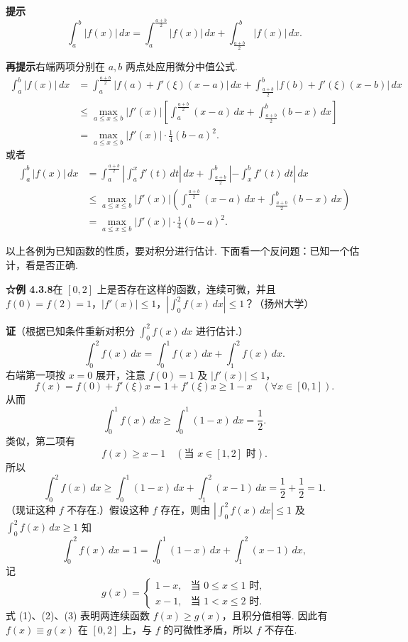 \documentclass[UTF8,12pt,a4paper,fontset=fandol]{ctexart}
\begin{document}
\noindent\textbf{提示}\quad
\[
\int_a^b|f(x)|\,dx
=\int_a^{\frac{a+b}{2}}|f(x)|\,dx
+\int_{\frac{a+b}{2}}^b|f(x)|\,dx.
\]

\noindent\textbf{再提示}\quad 右端两项分别在 $a,b$ 两点处应用微分中值公式.
\[
\begin{aligned}
\int_a^b|f(x)|\,dx
&=\int_a^{\frac{a+b}{2}}|f(a)+f'(\xi)(x-a)|\,dx
+\int_{\frac{a+b}{2}}^b|f(b)+f'(\xi)(x-b)|\,dx\\
&\le\max_{a\le x\le b}|f'(x)|
\left[\int_a^{\frac{a+b}{2}}(x-a)\,dx
+\int_{\frac{a+b}{2}}^b(b-x)\,dx\right]\\
&=\max_{a\le x\le b}|f'(x)|\cdot\frac14(b-a)^2.
\end{aligned}
\]
或者
\[
\begin{aligned}
\int_a^b|f(x)|\,dx
&=\int_a^{\frac{a+b}{2}}\left|\int_a^x f'(t)\,dt\right|\,dx
+\int_{\frac{a+b}{2}}^b\left|-\int_x^b f'(t)\,dt\right|\,dx\\
&\le\max_{a\le x\le b}|f'(x)|
\left(\int_a^{\frac{a+b}{2}}(x-a)\,dx
+\int_{\frac{a+b}{2}}^b(b-x)\,dx\right)\\
&=\max_{a\le x\le b}|f'(x)|\cdot\frac14(b-a)^2.
\end{aligned}
\]

\noindent 以上各例为已知函数的性质，要对积分进行估计. 下面看一个反问题：已知一个估计，看是否正确.

\noindent\textbf{☆例 4.3.8}\quad 在 $[0,2]$ 上是否存在这样的函数，连续可微，并且 $f(0)=f(2)=1$，$|f'(x)|\le1$，$\left|\int_0^2 f(x)\,dx\right|\le1$？（扬州大学）

\noindent\textbf{证}\quad （根据已知条件重新对积分 $\int_0^2 f(x)\,dx$ 进行估计.）
\[
\int_0^2 f(x)\,dx=\int_0^1 f(x)\,dx+\int_1^2 f(x)\,dx.
\]
右端第一项按 $x=0$ 展开，注意 $f(0)=1$ 及 $|f'(x)|\le1$，
\[
f(x)=f(0)+f'(\xi)x=1+f'(\xi)x\ge1-x\quad(\forall x\in[0,1]).
\tag{1}
\]
从而
\[
\int_0^1 f(x)\,dx\ge\int_0^1(1-x)\,dx=\frac12.
\]
类似，第二项有
\[
f(x)\ge x-1\quad(\text{当 }x\in[1,2]\text{ 时}).
\tag{2}
\]
所以
\[
\int_0^2 f(x)\,dx
\ge\int_0^1(1-x)\,dx+\int_1^2(x-1)\,dx
=\frac12+\frac12=1.
\]
（现证这种 $f$ 不存在.）假设这种 $f$ 存在，则由 $\left|\int_0^2 f(x)\,dx\right|\le1$ 及 $\int_0^2 f(x)\,dx\ge1$ 知
\[
\int_0^2 f(x)\,dx=1
=\int_0^1(1-x)\,dx+\int_1^2(x-1)\,dx,
\tag{3}
\]
记
\[
g(x)=
\begin{cases}
1-x, & \text{当 }0\le x\le1\text{ 时},\\
x-1, & \text{当 }1<x\le2\text{ 时}.
\end{cases}
\]
式 (1)、(2)、(3) 表明两连续函数 $f(x)\ge g(x)$，且积分值相等. 因此有 $f(x)\equiv g(x)$ 在 $[0,2]$ 上，与 $f$ 的可微性矛盾，所以 $f$ 不存在.
\end{document}
